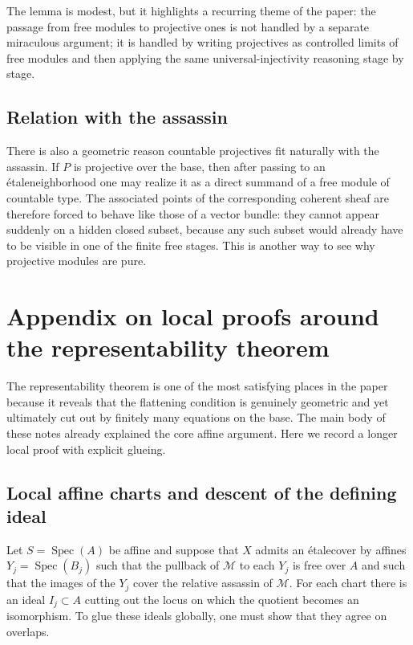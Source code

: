 \documentclass[11pt,oneside]{article}
\newcommand{\M}{\mathcal M}
\newcommand{\Spec}{\operatorname{Spec}}
\newcommand{\etale}{\'etale}
\begin{document}
The lemma is modest, but it highlights a recurring theme of the paper: the passage from free modules to projective ones is not handled by a separate miraculous argument; it is handled by writing projectives as controlled limits of free modules and then applying the same universal-injectivity reasoning stage by stage.

\subsection{Relation with the assassin}

There is also a geometric reason countable projectives fit naturally with the assassin.  If $P$ is projective over the base, then after passing to an \etale neighborhood one may realize it as a direct summand of a free module of countable type.  The associated points of the corresponding coherent sheaf are therefore forced to behave like those of a vector bundle: they cannot appear suddenly on a hidden closed subset, because any such subset would already have to be visible in one of the finite free stages.  This is another way to see why projective modules are pure.

\section{Appendix on local proofs around the representability theorem}

The representability theorem is one of the most satisfying places in the paper because it reveals that the flattening condition is genuinely geometric and yet ultimately cut out by finitely many equations on the base.  The main body of these notes already explained the core affine argument.  Here we record a longer local proof with explicit glueing.

\subsection{Local affine charts and descent of the defining ideal}

Let $S=\Spec(A)$ be affine and suppose that $X$ admits an \etale cover by affines $Y_j=\Spec(B_j)$ such that the pullback of $\M$ to each $Y_j$ is free over $A$ and such that the images of the $Y_j$ cover the relative assassin of $\M$.  For each chart there is an ideal $I_j\subset A$ cutting out the locus on which the quotient becomes an isomorphism.  To glue these ideals globally, one must show that they agree on overlaps.
\end{document}
